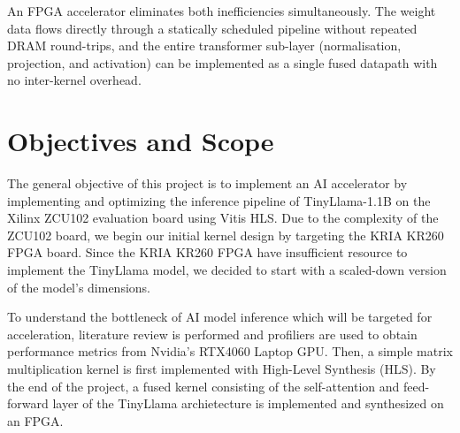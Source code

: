 An FPGA accelerator eliminates both inefficiencies
simultaneously. The weight data flows directly through a statically scheduled
pipeline without repeated DRAM round-trips, and the entire transformer
sub-layer (normalisation, projection, and activation) can be implemented
as a single fused datapath with no inter-kernel overhead. 


\section{Objectives and Scope}
\label{sec:objectives}
The general objective of this project is to implement an AI accelerator by
implementing and optimizing the inference pipeline of
TinyLlama-1.1B on the Xilinx ZCU102 evaluation board using Vitis HLS. Due to the 
complexity of the ZCU102 board, we begin our initial kernel design by targeting the 
KRIA KR260 FPGA board. Since the KRIA KR260 FPGA have insufficient resource to 
implement the TinyLlama model, we decided to start with a scaled-down version of 
the model's dimensions.

To understand the bottleneck of AI model inference which will be targeted for acceleration, 
literature review is performed and profiliers are used to obtain performance metrics from 
Nvidia's RTX4060 Laptop GPU. Then, a simple matrix multiplication kernel is 
first implemented with High-Level Synthesis (HLS). By the end of the project, 
a fused kernel consisting of the self-attention and feed-forward layer of the TinyLlama 
archietecture is implemented and synthesized on an FPGA. 




